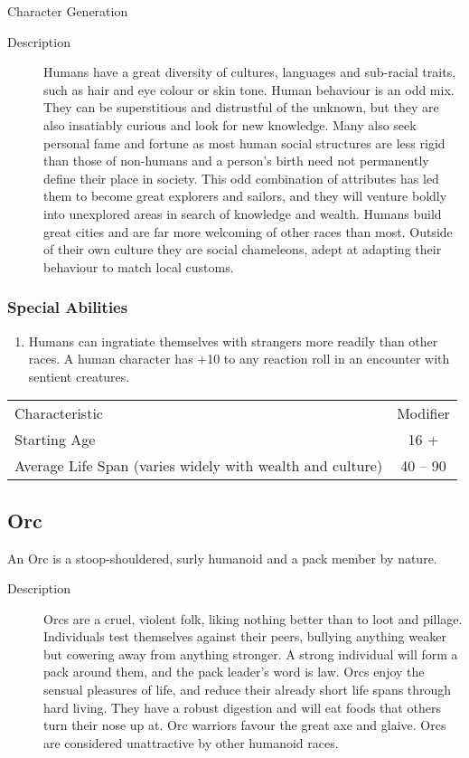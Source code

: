 \begin{Chapter}{Character Generation}
\begin{description}
\item[Description] Humans have a great diversity of cultures,
  languages and sub-racial traits, such as hair and eye colour or skin
  tone.  Human behaviour is an odd mix.  They can be superstitious and
  distrustful of the unknown, but they are also insatiably curious and
  look for new knowledge.  Many also seek personal fame and fortune as
  most human social structures are less rigid than those of non-humans
  and a person’s birth need not permanently define their place in
  society.  This odd combination of attributes has led them to become
  great explorers and sailors, and they will venture boldly into
  unexplored areas in search of knowledge and wealth.  Humans build
  great cities and are far more welcoming of other races than most.
  Outside of their own culture they are social chameleons, adept at
  adapting their behaviour to match local customs.
\end{description}

\subsubsection{Special Abilities}

\begin{enumerate}

\item Humans can ingratiate themselves with strangers more readily
  than other races.  A human character has +10 to any reaction roll in
  an encounter with sentient creatures.

\end{enumerate}

\begin{tabularx}{\columnwidth}{Xc}
Characteristic				& Modifier \\
Starting Age				& 16 + \\
Average Life Span (varies widely with wealth and culture) & 40 -- 90 \\
\end{tabularx}

\subsection{Orc}

An Orc is a stoop-shouldered, surly humanoid and a pack member by
nature.

\begin{description}
\item[Description] Orcs are a cruel, violent folk, liking nothing
  better than to loot and pillage.  Individuals test themselves
  against their peers, bullying anything weaker but cowering away from
  anything stronger.  A strong individual will form a pack around
  them, and the pack leader’s word is law.  Orcs enjoy the sensual
  pleasures of life, and reduce their already short life spans through
  hard living.  They have a robust digestion and will eat foods that
  others turn their nose up at.  Orc warriors favour the great axe and
  glaive.  Orcs are considered unattractive by other humanoid races.
\end{description}


\end{Chapter}
